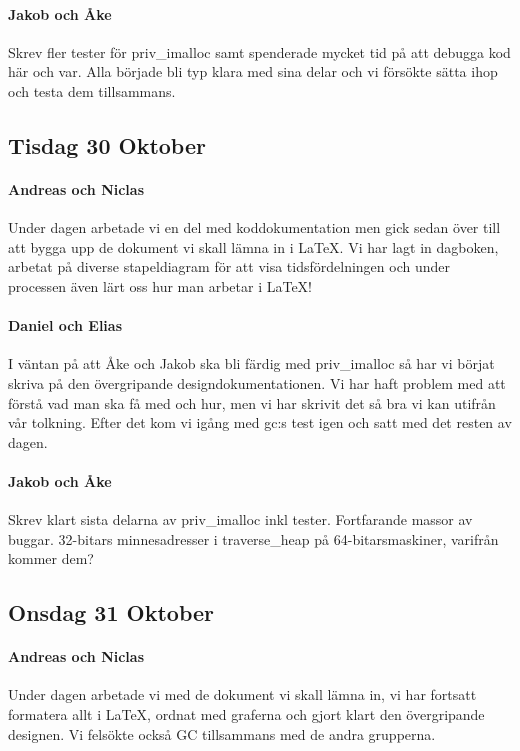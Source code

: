 \documentclass{article}
\begin{document}
\paragraph*{Jakob och Åke}
Skrev fler tester för priv\_imalloc samt spenderade mycket tid på att debugga kod här och var. Alla började bli typ klara med sina delar och vi försökte sätta ihop och testa dem tillsammans.

\subsection{Tisdag 30 Oktober}

\paragraph*{Andreas och Niclas}
Under dagen arbetade vi en del med koddokumentation men gick sedan över till att bygga upp de dokument vi skall lämna in i \LaTeX. Vi har lagt in dagboken, arbetat på diverse stapeldiagram för att visa tidsfördelningen och under processen även lärt oss hur man arbetar i \LaTeX!

\paragraph*{Daniel och Elias}
I väntan på att Åke och Jakob ska bli färdig med priv\_imalloc så har vi börjat skriva på den övergripande designdokumentationen. Vi har haft problem med att förstå vad man ska få med och hur, men vi har skrivit det så bra vi kan utifrån vår tolkning. Efter det kom vi igång med gc:s test igen och satt med det resten av dagen.

\paragraph*{Jakob och Åke}
Skrev klart sista delarna av priv\_imalloc inkl tester. Fortfarande massor av buggar. 32-bitars minnesadresser i traverse\_heap på 64-bitarsmaskiner, varifrån kommer dem?

\subsection{Onsdag 31 Oktober}
\paragraph*{Andreas och Niclas}
Under dagen arbetade vi med de dokument vi skall lämna in, vi har fortsatt formatera allt i \LaTeX, ordnat med graferna och gjort klart den övergripande designen. Vi felsökte också GC tillsammans med de andra grupperna.
\end{document}

